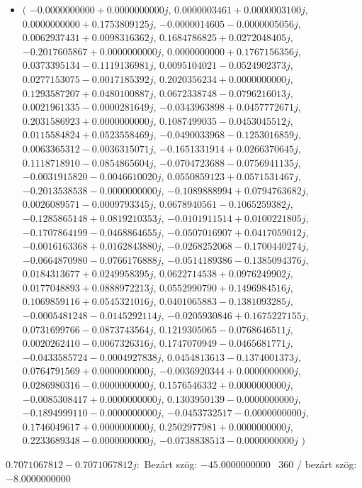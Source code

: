 \documentclass[14pt,a4paper]{article}
\begin{document}
\begin{itemize}
\item
$\big($
$-0.0000000000+0.0000000000j$, $0.0000003461+0.0000003100j$, $0.0000000000+0.1753809125j$, $-0.0000014605-0.0000005056j$, $0.0062937431+0.0098316362j$, $0.1684786825+0.0272048405j$, $-0.2017605867+0.0000000000j$, $0.0000000000+0.1767156356j$, $0.0373395134-0.1119136981j$, $0.0095104021-0.0524902373j$, $0.0277153075-0.0017185392j$, $0.2020356234+0.0000000000j$, $0.1293587207+0.0480100887j$, $0.0672338748-0.0796216013j$, $0.0021961335-0.0000281649j$, $-0.0343963898+0.0457772671j$, $0.2031586923+0.0000000000j$, $0.1087499035-0.0453045512j$, $0.0115584824+0.0523558469j$, $-0.0490033968-0.1253016859j$, $0.0063365312-0.0036315071j$, $-0.1651331914+0.0266370645j$, $0.1118718910-0.0854865604j$, $-0.0704723688-0.0756941135j$, $-0.0031915820-0.0046610020j$, $0.0550859123+0.0571531467j$, $-0.2013538538-0.0000000000j$, $-0.1089888994+0.0794763682j$, $0.0026089571-0.0009793345j$, $0.0678940561-0.1065259382j$, $-0.1285865148+0.0819210353j$, $-0.0101911514+0.0100221805j$, $-0.1707864199-0.0468864655j$, $-0.0507016907+0.0417059012j$, $-0.0016163368+0.0162843880j$, $-0.0268252068-0.1700440274j$, $-0.0664870980-0.0766176888j$, $-0.0514189386-0.1385094376j$, $0.0184313677+0.0249958395j$, $0.0622714538+0.0976249902j$, $0.0177048893+0.0888972213j$, $0.0552990790+0.1496984516j$, $0.1069859116+0.0545321016j$, $0.0401065883-0.1381093285j$, $-0.0005481248-0.0145292114j$, $-0.0205930846+0.1675227155j$, $0.0731699766-0.0873743564j$, $0.1219305065-0.0768646511j$, $0.0020262410-0.0067326316j$, $0.1747070949-0.0465681771j$, $-0.0433585724-0.0004927838j$, $0.0454813613-0.1374001373j$, $0.0764791569+0.0000000000j$, $-0.0036920344+0.0000000000j$, $0.0286980316-0.0000000000j$, $0.1576546332+0.0000000000j$, $-0.0085308417+0.0000000000j$, $0.1303950139-0.0000000000j$, $-0.1894999110-0.0000000000j$, $-0.0453732517-0.0000000000j$, $0.1746049617+0.0000000000j$, $0.2502977981+0.0000000000j$, $0.2233689348-0.0000000000j$, $-0.0738838513-0.0000000000j$
$\big)$
\end{itemize}
$0.7071067812-0.7071067812j$:\
Bezárt szög: $-45.0000000000$ \
360 / bezárt szög: $-8.0000000000$\
\end{document}
